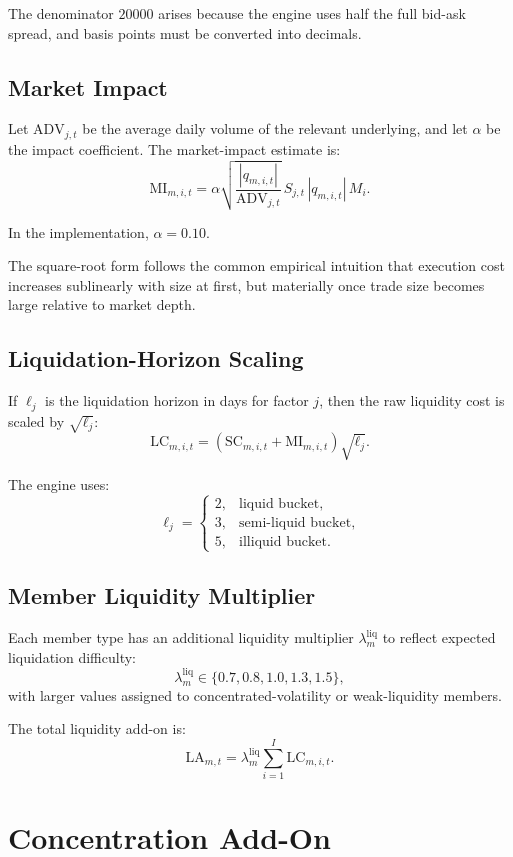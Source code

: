 \documentclass[11pt]{article}
\begin{document}
The denominator \(20000\) arises because the engine uses half the full bid-ask spread, and basis points must be converted into decimals.

\subsection{Market Impact}

Let \(\text{ADV}_{j,t}\) be the average daily volume of the relevant underlying, and let \(\alpha\) be the impact coefficient. The market-impact estimate is:
\[
\text{MI}_{m,i,t}
=
\alpha
\sqrt{\frac{|q_{m,i,t}|}{\text{ADV}_{j,t}}}
\,S_{j,t}\,|q_{m,i,t}|\,M_i.
\]

In the implementation, \(\alpha = 0.10\).

The square-root form follows the common empirical intuition that execution cost increases sublinearly with size at first, but materially once trade size becomes large relative to market depth.

\subsection{Liquidation-Horizon Scaling}

If \(\ell_j\) is the liquidation horizon in days for factor \(j\), then the raw liquidity cost is scaled by \(\sqrt{\ell_j}\):
\[
\text{LC}_{m,i,t}
=
\left(\text{SC}_{m,i,t} + \text{MI}_{m,i,t}\right)\sqrt{\ell_j}.
\]

The engine uses:
\[
\ell_j =
\begin{cases}
2, & \text{liquid bucket},\\
3, & \text{semi-liquid bucket},\\
5, & \text{illiquid bucket}.
\end{cases}
\]

\subsection{Member Liquidity Multiplier}

Each member type has an additional liquidity multiplier \(\lambda_m^{\text{liq}}\) to reflect expected liquidation difficulty:
\[
\lambda_m^{\text{liq}} \in \{0.7, 0.8, 1.0, 1.3, 1.5\},
\]
with larger values assigned to concentrated-volatility or weak-liquidity members.

The total liquidity add-on is:
\[
\text{LA}_{m,t}
=
\lambda_m^{\text{liq}}
\sum_{i=1}^{I} \text{LC}_{m,i,t}.
\]

\section{Concentration Add-On}
\end{document}
